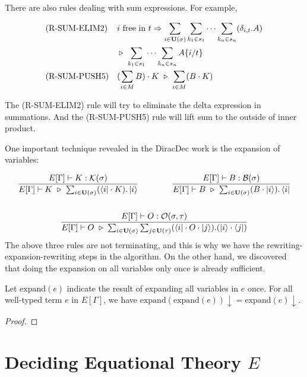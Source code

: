 \documentclass[runningheads]{llncs}
\begin{document}
There are also rules dealing with sum expressions. For example, 

\begin{align*}
    & \textrm{(R-SUM-ELIM2)}
    && i \text{ free in } t \Rightarrow \sum_{i \in \mathbf{U}(\sigma)} \sum_{k_1 \in s_1} \cdots \sum_{k_n \in s_n} (\delta_{i, t}.A) \\
    & && \triangleright\ \sum_{k_1 \in s_1} \cdots \sum_{k_n \in s_n} A\{i/t\} \\
    & \textrm{(R-SUM-PUSH5)}
    && (\sum_{i \in M} B)\cdot K \ \triangleright\ \sum_{i \in M}(B \cdot K)
\end{align*}

The (R-SUM-ELIM2) rule will try to eliminate the delta expression in summations.
And the (R-SUM-PUSH5) rule will lift sum to the outside of inner product.



One important technique revealed in the DiracDec work is the expansion of variables:

\begin{gather*}
    \frac{E[\Gamma] \vdash K : \KType(\sigma)}{E[\Gamma] \vdash K \ \reduce\ \sum_{i \in \mathbf{U}(\sigma)}(\bra{i}\cdot K).\ket{i}}
    \qquad \qquad
    \frac{E[\Gamma] \vdash B : \BType(\sigma)}{E[\Gamma] \vdash B \ \reduce\ \sum_{i \in \mathbf{U}(\sigma)}(B \cdot \ket{i}).\bra{i}} \\
    \\
    \frac{E[\Gamma] \vdash O : \OType(\sigma, \tau)}{E[\Gamma] \vdash O \ \reduce\ \sum_{i \in \mathbf{U}(\sigma)} \sum_{j \in \mathbf{U}(\tau)}(\bra{i} \cdot O \cdot \ket{j}).(\ket{i} \cdot \bra{j})}
\end{gather*}
The above three rules are not terminating, and this is why we have the rewriting-expansion-rewriting steps in the algorithm. On the other hand, we discovered that doing the expansion on all variables only once is already sufficient.

\begin{lemma}
    Let $\text{expand}(e)$ indicate the result of expanding all variables in $e$ once.
    For all well-typed term $e$ in $E[\Gamma]$, we have $\text{expand}(\text{expand}(e)) \downarrow = \text{expand}(e)\downarrow$.
\end{lemma}
\begin{proof}
\end{proof}



\section{Deciding Equational Theory $E$}
\end{document}
